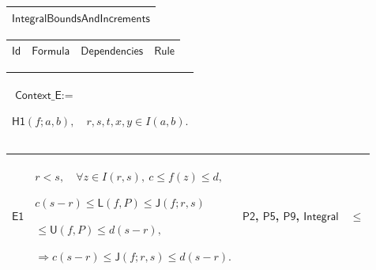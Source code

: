 \documentclass[11pt]{amsart}
\renewcommand{\arraystretch}{1.4}
\newlength{\FTCOneColumnBody}
\newlength{\FTCFourColumnBody}
\begin{document}
{\centering
\renewcommand{\arraystretch}{1.4}
\par\setlength{\parskip}{0pt}\nointerlineskip
\noindent
\begin{tabular}{|@{}>{\centering\arraybackslash}m{\FTCOneColumnBody}|}\hline
$\displaystyle \textsf{IntegralBoundsAndIncrements}$\\ \hline
\end{tabular}%
\par\setlength{\parskip}{0pt}\nointerlineskip
\noindent
\begin{tabular}{|@{}>{\centering\arraybackslash}m{0.078431\FTCFourColumnBody}|>{\centering\arraybackslash}m{0.535947\FTCFourColumnBody}|>{\centering\arraybackslash}m{0.281045\FTCFourColumnBody}|>{\centering\arraybackslash}m{0.104575\FTCFourColumnBody}|}\hline
$\displaystyle \textsf{Id}$ & $\displaystyle \textsf{Formula}$ & $\displaystyle \textsf{Dependencies}$ & $\displaystyle \textsf{Rule}$\\ \hline
\end{tabular}%
\par\setlength{\parskip}{0pt}\nointerlineskip
\noindent
\begin{tabular}{|@{}>{\centering\arraybackslash}m{\FTCOneColumnBody}|}\hline
$\displaystyle \textsf{Context\_E}:=$\par
$\displaystyle \textsf{H1}(f;a,b),\quad r,s,t,x,y\in I(a,b).$\\ \hline
\end{tabular}%
\par\setlength{\parskip}{0pt}\nointerlineskip
\noindent
\begin{tabular}{|@{}>{\centering\arraybackslash}m{0.078431\FTCFourColumnBody}|>{\centering\arraybackslash}m{0.535947\FTCFourColumnBody}|>{\centering\arraybackslash}m{0.281045\FTCFourColumnBody}|>{\centering\arraybackslash}m{0.104575\FTCFourColumnBody}|}\hline
\hypertarget{proof:E1}{$\displaystyle \textsf{E1}$} & $\displaystyle r<s,\quad\forall z\in I(r,s),\ c\le f(z)\le d,$\par
$\displaystyle c(s-r)\le\textsf{L}(f,P)\le\textsf{J}(f;r,s)$\par
$\displaystyle {}\le\textsf{U}(f,P)\le d(s-r),$\par
$\displaystyle \Rightarrow c(s-r)\le\textsf{J}(f;r,s)\le d(s-r).$ & \hyperlink{proof:P2}{$\displaystyle \textsf{P2}$}, \hyperlink{proof:P5}{$\displaystyle \textsf{P5}$}, \hyperlink{proof:P9}{$\displaystyle \textsf{P9}$}, \hyperlink{def:Integral}{$\displaystyle \textsf{Integral}$} & $\displaystyle \le$\\ \hline

\end{tabular}}
\end{document}
